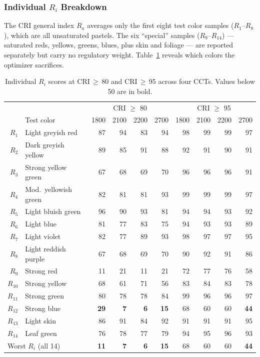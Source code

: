 \documentclass[11pt]{article}
\begin{document}
\subsubsection{Individual $R_i$ Breakdown}
\label{sec:ri-breakdown}

The CRI general index $R_a$ averages only the first eight test color
samples ($R_1$--$R_8$), which are all unsaturated pastels.  The six
``special'' samples ($R_9$--$R_{14}$) --- saturated reds, yellows,
greens, blues, plus skin and foliage --- are reported separately but
carry no regulatory weight.  Table~\ref{tab:ri-breakdown} reveals
which colors the optimizer sacrifices.

\begin{table}[H]
\centering
\caption{Individual $R_i$ scores at CRI\,$\geq$\,80 and CRI\,$\geq$\,95
  across four CCTs.  Values below 50 are in bold.}
\label{tab:ri-breakdown}
\small
\begin{tabular}{rl|rrrr|rrrr}
\toprule
 & & \multicolumn{4}{c|}{CRI $\geq$ 80}
   & \multicolumn{4}{c}{CRI $\geq$ 95} \\
 & Test color & 1800 & 2100 & 2200 & 2700
              & 1800 & 2100 & 2200 & 2700 \\
\midrule
$R_1$  & Light greyish red     & 87 & 94 & 83 & 94  & 98 & 99 & 99 & 97 \\
$R_2$  & Dark greyish yellow   & 89 & 85 & 91 & 88  & 92 & 91 & 90 & 91 \\
$R_3$  & Strong yellow green   & 67 & 68 & 69 & 70  & 96 & 96 & 96 & 91 \\
$R_4$  & Mod.\ yellowish green & 82 & 81 & 81 & 93  & 99 & 99 & 99 & 97 \\
$R_5$  & Light bluish green    & 96 & 90 & 93 & 81  & 94 & 94 & 93 & 92 \\
$R_6$  & Light blue            & 81 & 77 & 83 & 75  & 94 & 93 & 93 & 89 \\
$R_7$  & Light violet          & 82 & 77 & 89 & 93  & 98 & 97 & 97 & 95 \\
$R_8$  & Light reddish purple  & 67 & 68 & 69 & 70  & 90 & 92 & 91 & 86 \\
\midrule
$R_9$  & Strong red            & 11 & 21 & 11 & 21  & 72 & 77 & 76 & 58 \\
$R_{10}$ & Strong yellow       & 68 & 61 & 71 & 56  & 83 & 84 & 83 & 78 \\
$R_{11}$ & Strong green        & 80 & 78 & 78 & 84  & 99 & 96 & 96 & 97 \\
$R_{12}$ & Strong blue         & \textbf{29} & \textbf{7} & \textbf{6} & \textbf{15}
                                & 68 & 60 & 60 & \textbf{44} \\
$R_{13}$ & Light skin           & 86 & 91 & 84 & 92  & 91 & 91 & 91 & 95 \\
$R_{14}$ & Leaf green           & 76 & 78 & 77 & 79  & 94 & 95 & 96 & 93 \\
\midrule
\multicolumn{2}{l|}{Worst $R_i$ (all 14)} & \textbf{11} & \textbf{7} & \textbf{6} & \textbf{15}
                                & 68 & 60 & 60 & \textbf{44} \\
\bottomrule
\end{tabular}
\end{table}
\end{document}
